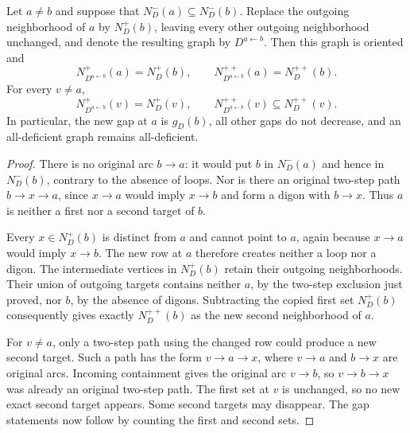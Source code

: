 \begin{lemma}
\label{lem:paper-single-row-copy}
Let $a\ne b$ and suppose that
$N_D^-(a)\subseteq N_D^-(b)$. Replace the outgoing neighborhood of
$a$ by $N_D^+(b)$, leaving every other outgoing neighborhood unchanged,
and denote the resulting graph by $D^{a\leftarrow b}$. Then this graph
is oriented and
\[
 N_{D^{a\leftarrow b}}^+(a)=N_D^+(b),\qquad
 N_{D^{a\leftarrow b}}^{++}(a)=N_D^{++}(b).
\]
For every $v\ne a$,
\[
 N_{D^{a\leftarrow b}}^+(v)=N_D^+(v),\qquad
 N_{D^{a\leftarrow b}}^{++}(v)\subseteq N_D^{++}(v).
\]
In particular, the new gap at $a$ is $g_D(b)$, all other gaps do not
decrease, and an all-deficient graph remains all-deficient.
\end{lemma}
\begin{proof}
There is no original arc $b\to a$: it would put $b$ in $N_D^-(a)$
and hence in $N_D^-(b)$, contrary to the absence of loops. Nor is there
an original two-step path $b\to x\to a$, since $x\to a$ would imply
$x\to b$ and form a digon with $b\to x$. Thus $a$ is neither a first
nor a second target of $b$.

Every $x\in N_D^+(b)$ is distinct from $a$ and cannot point to $a$,
again because $x\to a$ would imply $x\to b$. The new row at $a$
therefore creates neither a loop nor a digon. The intermediate vertices
in $N_D^+(b)$ retain their outgoing neighborhoods. Their union of
outgoing targets contains neither $a$, by the two-step exclusion just
proved, nor $b$, by the absence of digons. Subtracting the copied first
set $N_D^+(b)$ consequently gives exactly $N_D^{++}(b)$ as the new
second neighborhood of $a$.

For $v\ne a$, only a two-step path using the changed row could produce
a new second target. Such a path has the form $v\to a\to x$, where
$v\to a$ and $b\to x$ are original arcs. Incoming containment gives
the original arc $v\to b$, so $v\to b\to x$ was already an original
two-step path. The first set at $v$ is unchanged, so no new exact
second target appears. Some second targets may disappear. The gap
statements now follow by counting the first and second sets.
\end{proof}

